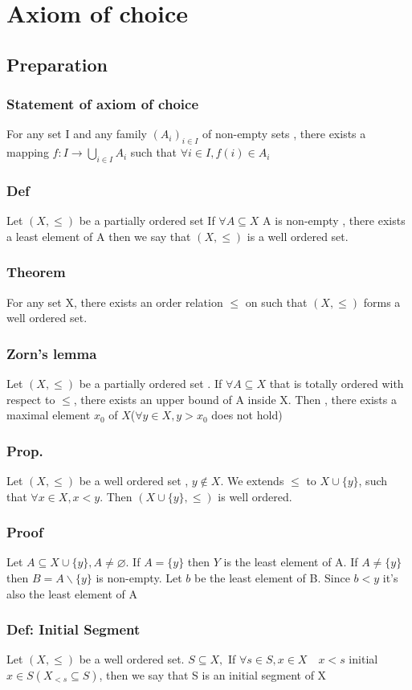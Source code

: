 \documentclass{book}
\begin{document}
\part{Axiom of choice}
\chapter{Preparation}
\section{Statement of axiom of choice}
For any set I and any family $(A_i)_{i\in I}$ of non-empty sets , there exists a mapping $f:I\rightarrow \bigcup\limits_{i\in I}A_i$ such that $\forall i\in I, f(i)\in A_i$
\section{Def} Let $(X,\leq)$ be a partially ordered set If $\forall A\subseteq X$ A is non-empty , there exists a least element of A then we say that $(X,\leq)$ is a well ordered set.
\section{Theorem }
For any set X, there exists an order relation $\leq$ on such that $(X,\leq)$ forms a well ordered set.
\section{Zorn's lemma}
Let $(X,\leq)$ be a partially ordered set . If $\forall A\subseteq X$ that is totally ordered with respect to $\leq $, there exists an upper bound of A inside X. Then , there exists a maximal element $x_0$ of $X$($\forall y\in X, y>x_0$ does not hold)
\section{Prop.}
Let $(X,\leq)$ be a well ordered set , $y\not\in X. $ We extends $\leq$ to $X\cup\{y\}$, such that $\forall x\in X,x<y.$ Then $(X\cup\{y\},\leq)$ is well ordered.
\section{Proof}
Let $A\subseteq X\cup\{y\},A\not=\varnothing$. If $A=\{y\}$ then $Y$ is the least element of A. If $A\not=\{y\}$ then $B=A\backslash\{y\}$ is non-empty. Let $b$ be the least element of B. Since $b<y$ it's also the least element of A
\section{Def: Initial Segment}
Let $(X,\leq)$ be a well ordered set. $S\subseteq X,$ If $\forall s\in S,x\in X\quad x<s$ initial $x\in S(X_{<s}\subseteq S)$, then we say that S is an initial segment of X
\end{document}

